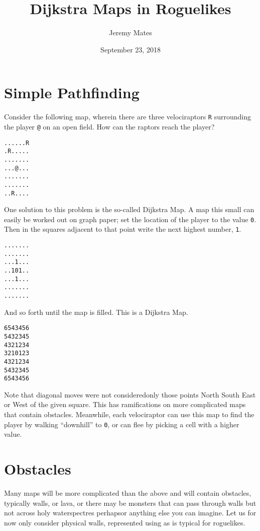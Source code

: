 \documentclass[12pt,a4paper]{article}
\title{Dijkstra Maps in Roguelikes}
\author{Jeremy Mates}
\date{September 23, 2018}
\begin{document}

\maketitle

\setlength{\parindent}{0pt}

\section*{Simple Pathfinding}

Consider the following map, wherein there are three velociraptors
\texttt{R} surrounding the player \texttt{@} on an open
field\cite{xkcd135}. How can the raptors reach the player?

\begin{verbatim}
......R
.R.....
.......
...@...
.......
.......
..R....
\end{verbatim}

One solution to this problem is the so-called Dijkstra Map\cite{tipodm}.
A map this small can easily be worked out on graph paper; set the
location of the player to the value \texttt{0}. Then in the squares
adjacent to that point write the next highest number, \texttt{1}.

\begin{verbatim}
.......
.......
...1...
..101..
...1...
.......
.......
\end{verbatim}

And so forth until the map is filled. This is a Dijkstra Map.

\begin{verbatim}
6543456
5432345
4321234
3210123
4321234
5432345
6543456
\end{verbatim}

Note that diagonal moves were not considered\textendash only those
points North South East or West of the given square. This has
ramifications on more complicated maps that contain obstacles.
Meanwhile, each velociraptor can use this map to find the player by
walking ``downhill'' to \texttt{0}, or can flee by picking a cell with a
higher value.

\section*{Obstacles}

Many maps will be more complicated than the above and will contain
obstacles, typically walls, or lava, or there may be monsters that can
pass through walls but not across holy water\textendash spectres
perhaps\textendash or anything else you can imagine. Let us for now
only consider physical walls, represented using \texttt{} as
is typical for roguelikes.
\end{document}
